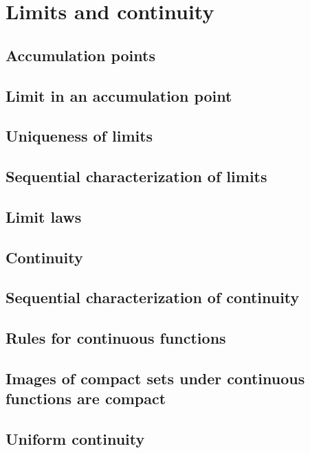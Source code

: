 \section{Limits and continuity}

\subsection{Accumulation points}

\subsection{Limit in an accumulation point}

\subsection{Uniqueness of limits}

\subsection{Sequential characterization of limits}

\subsection{Limit laws}

\subsection{Continuity}

\subsection{Sequential characterization of continuity}

\subsection{Rules for continuous functions}

\subsection{Images of compact sets under continuous functions are compact}

\subsection{Uniform continuity}
